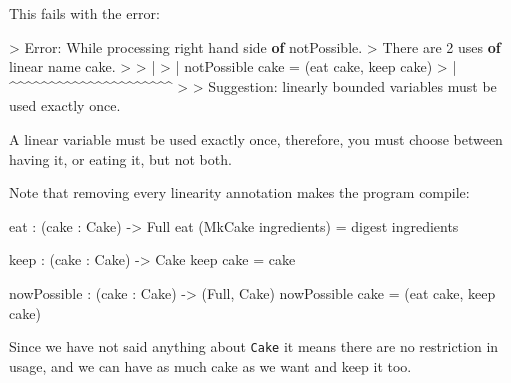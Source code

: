 \documentclass[
]{article}
\newenvironment{Shaded}{}{}
\newcommand{\DataTypeTok}[1]{\textcolor[rgb]{0.56,0.13,0.00}{#1}}
\newcommand{\DecValTok}[1]{\textcolor[rgb]{0.25,0.63,0.44}{#1}}
\newcommand{\KeywordTok}[1]{\textcolor[rgb]{0.00,0.44,0.13}{\textbf{#1}}}
\newcommand{\NormalTok}[1]{#1}
\newcommand{\OperatorTok}[1]{\textcolor[rgb]{0.40,0.40,0.40}{#1}}
\newcommand{\OtherTok}[1]{\textcolor[rgb]{0.00,0.44,0.13}{#1}}
\begin{document}
This fails with the error:

\begin{Shaded}
\begin{Highlighting}[]
\OperatorTok{\textgreater{}} \DataTypeTok{Error}\OperatorTok{:} \DataTypeTok{While}\NormalTok{ processing right hand side }\KeywordTok{of}\NormalTok{ notPossible}\OperatorTok{.}
\OperatorTok{\textgreater{}}   \DataTypeTok{There}\NormalTok{ are }\DecValTok{2}\NormalTok{ uses }\KeywordTok{of}\NormalTok{ linear name cake}\OperatorTok{.}
\OperatorTok{\textgreater{}} 
\OperatorTok{\textgreater{}}     \OperatorTok{|}
\OperatorTok{\textgreater{}}     \OperatorTok{|}\NormalTok{ notPossible cake }\OtherTok{=}\NormalTok{ (eat cake, keep cake)}
\OperatorTok{\textgreater{}}     \OperatorTok{|}                    \OperatorTok{\^{}\^{}\^{}\^{}\^{}\^{}\^{}\^{}\^{}\^{}\^{}\^{}\^{}\^{}\^{}\^{}\^{}\^{}\^{}\^{}\^{}}
\OperatorTok{\textgreater{}} 
\OperatorTok{\textgreater{}} \DataTypeTok{Suggestion}\OperatorTok{:}\NormalTok{ linearly bounded variables must be used exactly once}\OperatorTok{.}
\end{Highlighting}
\end{Shaded}

A linear variable must be used exactly once, therefore, you must choose
between having it, or eating it, but not both.

Note that removing every linearity annotation makes the program compile:

\begin{Shaded}
\begin{Highlighting}[]
\NormalTok{eat }\OperatorTok{:}\NormalTok{ (cake }\OperatorTok{:} \DataTypeTok{Cake}\NormalTok{) }\OtherTok{{-}\textgreater{}} \DataTypeTok{Full}
\NormalTok{eat (}\DataTypeTok{MkCake}\NormalTok{ ingredients) }\OtherTok{=}\NormalTok{ digest ingredients}

\NormalTok{keep }\OperatorTok{:}\NormalTok{ (cake }\OperatorTok{:} \DataTypeTok{Cake}\NormalTok{) }\OtherTok{{-}\textgreater{}} \DataTypeTok{Cake}
\NormalTok{keep cake }\OtherTok{=}\NormalTok{ cake}

\NormalTok{nowPossible }\OperatorTok{:}\NormalTok{ (cake }\OperatorTok{:} \DataTypeTok{Cake}\NormalTok{) }\OtherTok{{-}\textgreater{}}\NormalTok{ (}\DataTypeTok{Full}\NormalTok{, }\DataTypeTok{Cake}\NormalTok{)}
\NormalTok{nowPossible cake }\OtherTok{=}\NormalTok{ (eat cake, keep cake)}
\end{Highlighting}
\end{Shaded}

Since we have not said anything about \texttt{Cake} it means there are
no restriction in usage, and we can have as much cake as we want and
keep it too.
\end{document}
